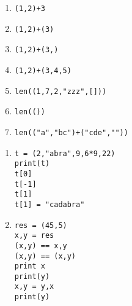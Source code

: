 \begin{multicols}{2}
  \begin{enumerate}[label=\emph{\alph*)}]
    \item \texttt{(1,2)+3}
    \item \texttt{(1,2)+(3)}
    \item \texttt{(1,2)+(3,)}
    \item \texttt{(1,2)+(3,4,5)}
    \item \texttt{len((1,7,2,"zzz",[]))}
    \item \texttt{len(())}
    \item \texttt{len(("a","bc")+("cde",""))}
  \end{enumerate}




\begin{enumerate}[label=\emph{\alph*)}]
\item 
\begin{lstlisting}
t = (2,"abra",9,6*9,22)
print(t)
t[0]
t[-1]
t[1]
t[1] = "cadabra" 
\end{lstlisting}
\end{enumerate}

\begin{enumerate}[label=\emph{\alph*)}]
\setcounter{enumi}{1}
\item 
\begin{lstlisting}
res = (45,5)
x,y = res
(x,y) == x,y
(x,y) == (x,y)
print x
print(y)
x,y = y,x
print(y)
\end{lstlisting}
\end{enumerate}



\end{multicols}
